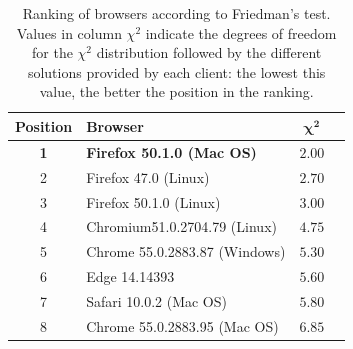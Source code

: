 \documentclass{article}
\begin{document}
\setlength{\tabcolsep}{10pt}
\begin{table}
\caption{Ranking of browsers according to Friedman's test. Values in column $\chi^2$ indicate the degrees of freedom for the $\chi^2$ distribution followed by the different solutions provided by each client: the lowest this value, the better the position in the ranking. }
\label{tab:friedman-results}
\begin{center}
\begin{tabular}{clcc}
\bf Position & {\bf Browser}	 &  {$\mathbf{\chi^2}$} 	 \\
\hline
\bf 1 & \bf Firefox 50.1.0 (Mac OS)	& $\mathbf{2.00}$\\
2 & Firefox 47.0 (Linux)	& $2.70$\\
3 & Firefox 50.1.0 (Linux)	& $3.00$\\
4 & Chromium51.0.2704.79 (Linux)	& $4.75$\\
5 & Chrome 55.0.2883.87 (Windows)	& $5.30$\\
6 & Edge 14.14393	& $5.60$\\
7 & Safari 10.0.2 (Mac OS)	& $5.80$\\
8 & Chrome 55.0.2883.95 (Mac OS)	& $6.85$\\
\hline
\end{tabular}
\end{center}
\end{table}

\newpage
\clearpage
\end{document}
